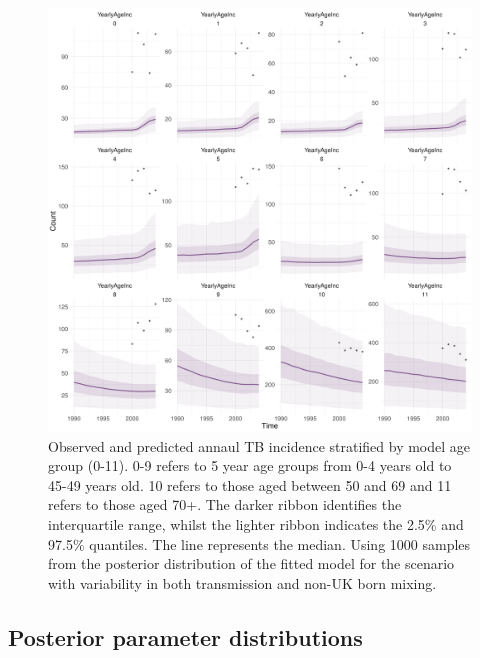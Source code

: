 \documentclass[11pt,twoside]{bristolthesis}
\begin{document}
  \begin{figure}
  
  {\centering \includegraphics[width=0.8\linewidth]{chapters/model-fitting/plots/overview-states-1990-age-1} 
  
  }
  
  \caption[Observed and predicted TB incidence stratified by model age group]{Observed and predicted annaul TB incidence stratified by model age group (0-11). 0-9 refers to 5 year age groups from 0-4 years old to 45-49 years old. 10 refers to those aged between 50 and 69 and 11 refers to those aged 70+. The darker ribbon identifies the interquartile range, whilst the lighter ribbon indicates the 2.5\% and 97.5\% quantiles. The line represents the median. Using 1000 samples from the posterior distribution of the fitted model for the scenario with variability in both transmission and non-UK born mixing.}\label{fig:09-age-strat-incidence}
  \end{figure}
  \newpage
  
  \hypertarget{posterior-parameter-distributions}{%
  \subsection{Posterior parameter distributions}\label{posterior-parameter-distributions}}
  
\end{document}
